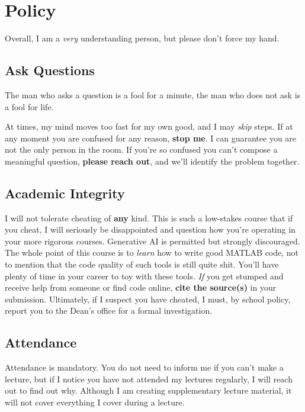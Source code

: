 \documentclass{article}
\begin{document}
\section{Policy}

Overall, I am a \emph{very} understanding person, but please don't force
my hand.

\subsection{Ask Questions}

\begin{displayquote}[Confucius]
	The man who asks a question is a fool for a minute, the man who
	does not ask is a fool for life.
\end{displayquote}

At times, my mind moves too fast for my own good, and I may \emph{skip}
steps.  If at any moment you are confused for any reason, \textbf{stop
me}.  I can guarantee you are not the only person in the room.  If
you're so confused you can't compose a meaningful question,
\textbf{please reach out}, and we'll identify the problem together.

\subsection{Academic Integrity}

I will not tolerate cheating of \textbf{any} kind.  This is such a
low-stakes course that if you cheat, I will seriously be disappointed
and question how you're operating in your more rigorous courses.
Generative AI is permitted but strongly discouraged.  The whole point of
this course is to \emph{learn} how to write good MATLAB code, not to
mention that the code quality of such tools is still quite shit.  You'll
have plenty of time in your career to toy with these tools.  \emph{If}
you get stumped and receive help from someone or find code online,
\textbf{cite the source(s)} in your submission.  Ultimately, if I
suspect you have cheated, I must, by school policy, report you to the
Dean's office for a formal investigation.

\subsection{Attendance}

Attendance is mandatory.  You do not need to inform me if you can't make
a lecture, but if I notice you have not attended my lectures regularly,
I will reach out to find out why.  Although I am creating supplementary
lecture material, it will not cover everything I cover during a lecture.
\end{document}
